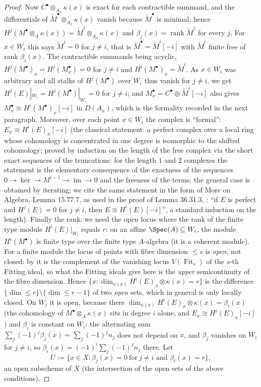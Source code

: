 \begin{proof}
Now $C^{\bullet}\otimes_{A_x}\kappa(x)$ is exact for each contractible
summand, and the differentials of
$\widetilde M^{\bullet}\otimes_{A_x}\kappa(x)$ vanish because
$\widetilde M^{\bullet}$ is minimal; hence
$H^j(M^{\bullet}\otimes_A\kappa(x))=\widetilde
M^{j}\otimes_{A_x}\kappa(x)$ and
$\beta_j(x)=\operatorname{rank}\widetilde M^{j}$ for every $j$.  For
$x\in W_i$ this says $\widetilde M^{j}=0$ for $j\ne i$, that is
$\widetilde M^{\bullet}=\widetilde M^{i}[-i]$ with $\widetilde M^{i}$
finite free of rank $\beta_i(x)$.  The contractible summands being
acyclic, $H^j(M^{\bullet})_x=H^j(M^{\bullet}_x)=0$ for $j\ne i$ and
$H^i(M^{\bullet})_x=\widetilde M^{i}$.  As $x\in W_i$ was arbitrary
and all stalks of $H^j(M^{\bullet})$ over $W_i$ thus vanish for
$j\ne i$, we get $H^j(E)|_{W_i}=H^j(M^{\bullet})|_{W_i}=0$ for
$j\ne i$; and $M^{\bullet}_x=C^{\bullet}\oplus\widetilde M^{i}[-i]$
also gives $M^{\bullet}_x\cong H^i(M^{\bullet})_x[-i]$ in $D(A_x)$,
which is the formality recorded in the next paragraph.
Moreover, over each point $x\in W_i$ the complex is
``formal'': $E_x\cong H^i(E)_x[-i]$ (the classical statement: a perfect
complex over a local ring whose cohomology is concentrated in one
degree is isomorphic to the shifted cohomology; proved by induction on
the length of the free complex via the short exact sequences of the
truncations: for the length $1$ and $2$ complexes the statement is the
elementary consequence of the exactness of the sequences
$0\to\ker\to M^{i-1}\to\operatorname{im}\to0$ and the freeness of the
terms; the general case is obtained by iterating; we cite the same
statement in the form of More on Algebra, Lemma 15.77.7, as used in
the proof of Lemma 36.31.3,
: ``if $E$ is
perfect and $H^j(E)=0$ for $j\ne i$, then
$E\cong H^i(E)[-i]$'', a standard induction on the length).
Finally the rank: we need the open locus where
the rank of the finite type module $H^i(E)|_{W_i}$ equals $r$: on an
affine $\Spec(A)\subseteq W_i$, the module $H^i(M^{\bullet})$ is
finite type over the finite type $A$-algebra (it is a coherent
module).  For a finite module the locus of points with fibre dimension
$\le s$ is \emph{open}, not closed: by
 it is the complement of the vanishing
locus $V(\operatorname{Fit}_s)$ of the $s$-th Fitting ideal, so what the
Fitting ideals give here is the \emph{upper} semicontinuity of the fibre
dimension.  Hence
$\{x:\dim_{\kappa(x)}H^i(E)_x\otimes\kappa(x)=r\}$ is the difference
$\{\dim\le r\}\setminus\{\dim\le r-1\}$ of two \emph{open} sets, which
in general is only locally closed.  On $W_i$ it is open, because there
$\dim_{\kappa(x)}H^i(E)_x\otimes\kappa(x)=\beta_i(x)$ (the cohomology of
$M^{\bullet}\otimes_A\kappa(x)$ sits in degree $i$ alone, and
$E_x\cong H^i(E)_x[-i]$) and $\beta_i$ is constant on $W_i$: the alternating
sum $\sum_j(-1)^j\beta_j(x)=\sum_j(-1)^jn_j$ does not depend on $x$, and
$\beta_j$ vanishes on $W_i$ for $j\ne i$, so
$\beta_i(x)=(-1)^i\sum_j(-1)^jn_j$ there.
Let
\[
U:=\{x\in X:\beta_j(x)=0\ \text{for}\ j\ne i\text{ and }
\beta_i(x)=r\},
\]
an open subscheme of $X$ (the intersection of the open sets of the
above conditions).


\end{proof}
